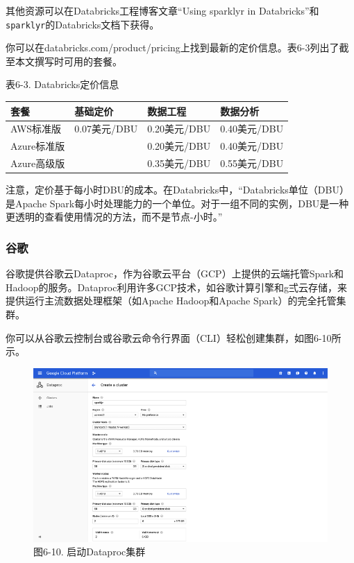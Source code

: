\documentclass[
]{article}
\begin{document}
其他资源可以在Databricks工程博客文章``Using sparklyr in
Databricks''和\texttt{sparklyr}的Databricks文档下获得。

你可以在databricks.com/product/pricing上找到最新的定价信息。表6-3列出了截至本文撰写时可用的套餐。

表6-3. Databricks定价信息

\begin{longtable}[]{@{}llll@{}}
\toprule
套餐 & 基础定价 & 数据工程 & 数据分析\tabularnewline
\midrule
\endhead
AWS标准版 & 0.07美元/DBU & 0.20美元/DBU & 0.40美元/DBU\tabularnewline
Azure标准版 & & 0.20美元/DBU & 0.40美元/DBU\tabularnewline
Azure高级版 & & 0.35美元/DBU & 0.55美元/DBU\tabularnewline
\bottomrule
\end{longtable}

注意，定价基于每小时DBU的成本。在Databricks中，``Databricks单位（DBU）是Apache
Spark每小时处理能力的一个单位。对于一组不同的实例，DBU是一种更透明的查看使用情况的方法，而不是节点-小时。''

\hypertarget{ux8c37ux6b4c}{%
\subsubsection{谷歌}\label{ux8c37ux6b4c}}

谷歌提供谷歌云Dataproc，作为谷歌云平台（GCP）上提供的云端托管Spark和Hadoop的服务。Dataproc利用许多GCP技术，如谷歌计算引擎和g弍云存储，来提供运行主流数据处理框架（如Apache
Hadoop和Apache Spark）的完全托管集群。

你可以从谷歌云控制台或谷歌云命令行界面（CLI）轻松创建集群，如图6-10所示。

\begin{figure}
\centering
\includegraphics{figures/6_10.png}
\caption{图6-10. 启动Dataproc集群}
\end{figure}
\end{document}
